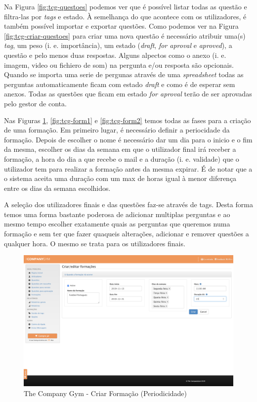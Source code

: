 Na Figura \ref{fig:tcg-questoes} podemos ver que é possível listar todas as questão e filtra-las por \textit{tags} e estado. À semelhança do que acontece com os utilizadores, é também possível importar e exportar questões. Como podemos ver na Figura \ref{fig:tcg-criar-questoes} para criar uma nova questão é necessário atribuir uma(s) \textit{tag}, um peso (i. e. importância), um estado (\textit{draft}, \textit{for aproval} e \textit{aproved}), a questão e pelo menos duas respostas. Alguns alpectos como o anexo (i. e. imagem, video ou fichiero de som) na pergunta e/ou resposta são opcionais. Quando se importa uma serie de pergunas através de uma \textit{spreadsheet} todas as perguntas automaticamente ficam com estado \textit{draft} e como é de esperar sem anexos. Todas as questões que ficam em estado \textit{for aproval} terão de ser aprovadas pelo gestor de conta.


Nas Figuras \ref{fig:tcg-form}, \ref{fig:tcg-form1} e \ref{fig:tcg-form2} temos todas as fases para a criação de uma formação. Em primeiro lugar, é necessário definir a periocidade da formação.  Depois de escolher o nome é necessário dar um dia para o inicio e o fim da mesma, escolher os dias da semana em que o utilizador final irá receber a formação, a hora do dia a que recebe o mail e a duração (i. e. validade) que o utilizador tem para realizar a formação antes da mesma expirar. É de notar que a o sistema aceita uma duração com um max de horas igual à menor diferença entre os dias da semana escolhidos.

 A seleção dos utilizadores finais e das questões faz-se através de tags. Desta forma temos uma forma bastante poderosa de adicionar multiplas perguntas e ao mesmo tempo escolher exatamente quais as perguntas que queremos numa formação e sem ter que fazer quaqueis alterações, adicionar e remover questões a qualquer hora. O mesmo se trata para os utilizadores finais. 
 


\begin{figure}[ht!]
	\begin{center}
		\includegraphics[width=1\textwidth]{img/tcg/tcg-form.png}
		\caption{The Company Gym - Criar Formação (Periodicidade)}
		\label{fig:tcg-form}
	\end{center}
\end{figure}
 

